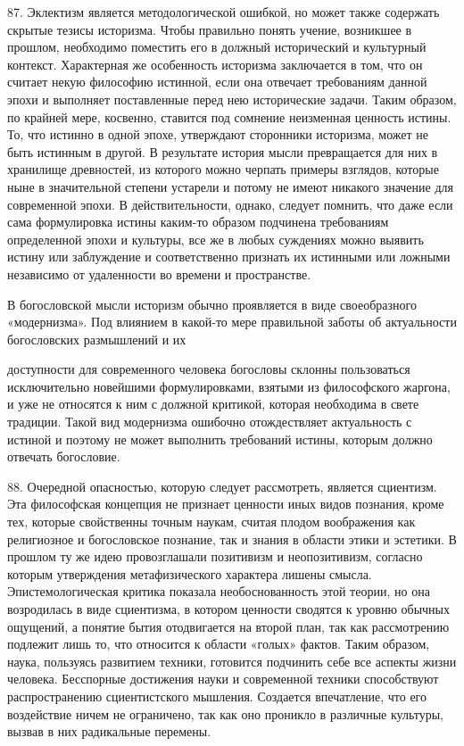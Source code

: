 \documentclass[a5paper,10pt]{article}
\begin{document}
87. Эклектизм является методологической ошибкой, но может также содержать
скрытые тезисы историзма. Чтобы правильно понять учение, возникшее в прошлом,
необходимо поместить его в должный исторический и культурный контекст.
Характерная же особенность историзма заключается в том, что он считает некую
философию истинной, если она отвечает требованиям данной эпохи и выполняет
поставленные перед нею исторические задачи. Таким образом, по крайней мере,
косвенно, ставится под сомнение неизменная ценность истины. То, что истинно в
одной эпохе, утверждают сторонники историзма, может не быть истинным в другой.
В результате история мысли превращается для них в хранилище древностей, из
которого можно черпать примеры взглядов, которые ныне в значительной степени
устарели и потому не имеют никакого значение для современной эпохи. В
действительности, однако, следует помнить, что даже если сама формулировка
истины каким-то образом подчинена требованиям определенной эпохи и культуры,
все же в любых суждениях можно выявить истину или заблуждение и соответственно
признать их истинными или ложными независимо от удаленности во времени и
пространстве.

В богословской мысли историзм обычно проявляется в виде своеобразного
«модернизма». Под влиянием в какой-то мере правильной заботы об актуальности
богословских размышлений и их

доступности для современного человека богословы склонны пользоваться
исключительно новейшими формулировками, взятыми из философского жаргона, и уже
не относятся к ним с должной критикой, которая необходима в свете традиции.
Такой вид модернизма ошибочно отождествляет актуальность с истиной и поэтому не
может выполнить требований истины, которым должно отвечать богословие.

88. Очередной опасностью, которую следует рассмотреть, является сциентизм. Эта
философская концепция не признает ценности иных видов познания, кроме тех,
которые свойственны точным наукам, считая плодом воображения как религиозное и
богословское познание, так и знания в области этики и эстетики. В прошлом ту же
идею провозглашали позитивизм и неопозитивизм, согласно которым утверждения
метафизического характера лишены смысла. Эпистемологическая критика показала
необоснованность этой теории, но она возродилась в виде сциентизма, в котором
ценности сводятся к уровню обычных ощущений, а понятие бытия отодвигается на
второй план, так как рассмотрению подлежит лишь то, что относится к области
«голых» фактов. Таким образом, наука, пользуясь развитием техники, готовится
подчинить себе все аспекты жизни человека. Бесспорные достижения науки и
современной техники способствуют распространению сциентистского мышления.
Создается впечатление, что его воздействие ничем не ограничено, так как оно
проникло в различные культуры, вызвав в них радикальные перемены.
\end{document}
